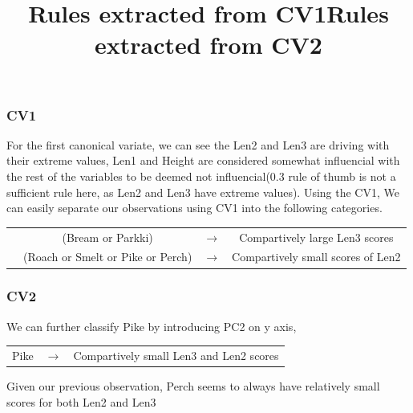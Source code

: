 \documentclass[openany]{article}
\begin{document}
			\subsubsection{CV1}
				For the first canonical variate, we can see the Len2 and Len3 are driving with their extreme values, Len1 and Height are considered somewhat influencial
				with the rest of the variables to be deemed not influencial(0.3 rule of thumb is not a sufficient rule here, as Len2 and Len3 have extreme values).
				Using the CV1, We can easily separate our observations using CV1 into the following categories.
				\begin{center}
					
					\begin{tabular}{ c c c c }
						\title{Rules extracted from CV1}
						&(Bream or Parkki) &$\rightarrow$& Compartively large Len3 scores  \\ 
						&(Roach or Smelt or Pike or Perch) &$\rightarrow$& Compartively small scores of Len2 \\ 
					\end{tabular}
				\end{center}
			\subsubsection{CV2}
				We can further classify Pike by introducing PC2 on y axis,
				\begin{center}

					\begin{tabular}{ c c c }
						\title{Rules extracted from CV2}
						Pike & $\rightarrow$ &Compartively small Len3 and Len2 scores  \\ 
					\end{tabular}
				\end{center}
				Given our previous observation, Perch seems to always have relatively small scores for both Len2 and Len3
\end{document}
